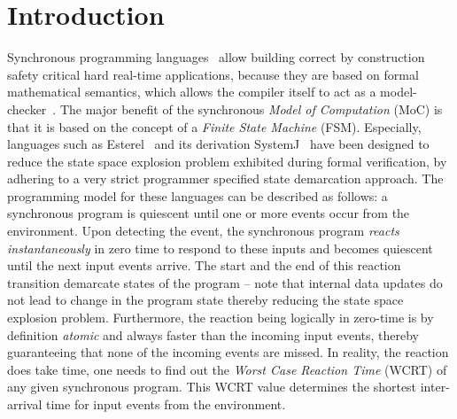 \section{Introduction}
\label{sec:introduction}

Synchronous programming languages~\cite{berry92} allow building correct
by construction safety critical hard real-time applications, because
they are based on formal mathematical semantics, which allows the
compiler itself to act as a
model-checker~\cite{jagadeesan1995safety}. The major benefit of the
synchronous \textit{Model of Computation} (MoC) is that it is based on
the concept of a \textit{Finite State Machine} (FSM). Especially,
languages such as Esterel~\cite{berry92} and its derivation
SystemJ~\cite{amal10} have been designed to reduce the state space
explosion problem exhibited during formal verification, by adhering to a
very strict programmer specified state demarcation approach. The
programming model for these languages can be described as follows: a
synchronous program is quiescent until one or more events occur from the
environment. Upon detecting the event, the synchronous program
\textit{reacts} \textit{instantaneously} in zero time to respond to
these inputs and becomes quiescent until the next input events
arrive. The start and the end of this reaction transition demarcate
states of the program -- note that internal data updates do not lead to
change in the program state thereby reducing the state space explosion
problem. Furthermore, the reaction being logically in zero-time is by
definition \textit{atomic} and always faster than the incoming input
events, thereby guaranteeing that none of the incoming events are
missed. In reality, the reaction does take time, one needs to find out
the \textit{Worst Case Reaction Time} (WCRT) of any given synchronous
program. This WCRT value determines the shortest inter-arrival time for
input events from the environment.

